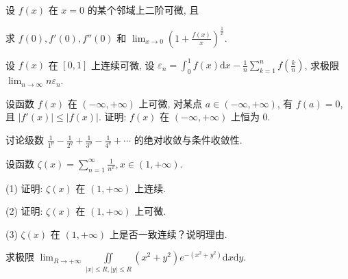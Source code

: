 \par{}
\par{}
设 $f(x)$ 在 $x = 0$ 的某个邻域上二阶可微, 且\par
\nopagebreak[4]
求 $f(0), f'(0), f''(0)$ 和 $\lim_{x \to 0} \left(1 + \frac{f(x)}{x}\right)^{\frac{1}{x}}$.\par
\par{}
设 $f(x)$ 在 $[0,1]$ 上连续可微, 设 $\varepsilon_{n} = \int_{0}^{1} f(x) \mathrm{d}x - \frac{1}{n} \sum_{k=1}^{n} f\left(\frac{k}{n}\right)$, 求极限 $\lim_{n \to \infty} n\varepsilon_{n}$.\par
\par{}
设函数 $f(x)$ 在 $(- \infty, + \infty)$ 上可微, 对某点 $a \in (-\infty, + \infty)$, 有 $f(a) = 0$, 且 $|f'(x)| \leq |f(x)|$. 证明: $f(x)$ 在 $(- \infty, + \infty)$ 上恒为 0.\par
\par{}
讨论级数  $\frac{1}{1^{p}} - \frac{1}{2^{q}} + \frac{1}{3^{p}} - \frac{1}{4^{q}} + \cdots$  的绝对收敛与条件收敛性.\par
\par{}
设函数 $\zeta(x) = \sum_{n=1}^{\infty} \frac{1}{n^x}, x \in (1, +\infty)$.\par
(1) 证明: $\zeta(x)$ 在 $(1, +\infty)$ 上连续.\par
(2) 证明: $\zeta(x)$ 在 $(1, +\infty)$ 上可微.\par
(3) $\zeta(x)$ 在 $(1, +\infty)$ 上是否一致连续？说明理由.\par
\par{}
求极限 $\lim_{R\to +\infty}\iint \limits_{|x|\leq R,|y|\leq R}(x^2 +y^2)e^{-(x^2 +y^2)}\mathrm{d}x\mathrm{d}y.$\par
